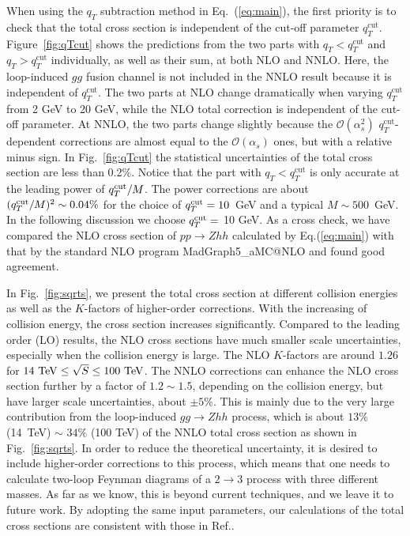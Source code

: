 \documentclass[a4paper,amsmath,preprintnumbers,showpacs,twocolumn,prl,superscriptaddress, nofootinbib]{revtex4}
\newcommand{\cut}{\textrm{cut}}
\newcommand{\mO}{\mathcal{O}}
\begin{document}
When using the $q_T$ subtraction method  in Eq.~(\ref{eq:main}), 
the first priority is to check that the total cross section is independent of the cut-off parameter $q_{T}^{\cut}$. 
Figure~\ref{fig:qTcut} shows the predictions from the two parts with $q_T<q_{T}^{\cut}$ and $q_T>q_{T}^{\cut}$
individually, as well as their sum, at both NLO and NNLO. 
Here, the loop-induced  $gg$ fusion channel is not included in the NNLO result because it is  independent of $q_T^{\cut}$.
The two parts at NLO 
change dramatically when varying $q_{T}^{\cut}$ from 2 GeV to 20 GeV, while the NLO total correction is independent of the cut-off parameter. 
At NNLO, the two parts change slightly because the $\mO(\alpha_s^2)$ $q_{T}^{\cut}$-dependent corrections are  almost
equal to the $\mO(\alpha_s)$ ones, but with a  relative minus sign.
%
 In Fig.~\ref{fig:qTcut} the statistical uncertainties of the total cross section are less than 0.2\%.
%
Notice that the part with $q_T<q_{T}^{\cut}$ is only accurate at  the leading power of $q_T^{\rm cut}/M$. 
The power corrections are about $(q_T^{\rm cut}/M)^2\sim 0.04\%$ for the choice of $q_T^{\rm cut}=10$~GeV  and a  typical   $M\sim 500$~GeV.
In the following discussion  we choose $q_T^{\rm cut}=$  10 GeV.
As a cross check, we have compared the NLO  cross section  of $pp\to Zhh$ calculated by Eq.(\ref{eq:main})
with that by the standard NLO program MadGraph5\_aMC@NLO  and found good agreement.



In Fig.~{\ref{fig:sqrts}},  we present the total cross section at different collision energies as well as the $K$-factors of higher-order corrections. 
With the increasing of collision energy,  the cross section increases significantly. 
Compared to the  leading order (LO) results, 
the NLO cross sections have much smaller scale uncertainties, especially when the collision energy is large. 
The NLO $K$-factors are around $1.26$ for $14~{\rm TeV}\leq\sqrt{S}\leq 100~{\rm TeV}$. 
The NNLO corrections can enhance the NLO cross section further by a factor of $1.2\sim 1.5$, depending on the collision energy, but have  larger scale uncertainties, about $\pm 5\%$. This is mainly due to the very large contribution from the loop-induced $gg\to Zhh$ process, which is about $13\%$ (14~TeV) $\sim$ $34\%$ (100 TeV) of the NNLO total cross section as shown in Fig.~\ref{fig:sqrts}. In order to reduce the theoretical uncertainty, it is desired to include higher-order corrections to this process, which means that one needs to calculate  two-loop Feynman diagrams of a $2\to 3$ process with three different masses. As far as we know, this is beyond current techniques, and we leave it to future work.
By adopting the same input parameters, 
our calculations of the total cross sections are consistent with those in Ref.\cite{Baglio:2012np}. 
\end{document}
